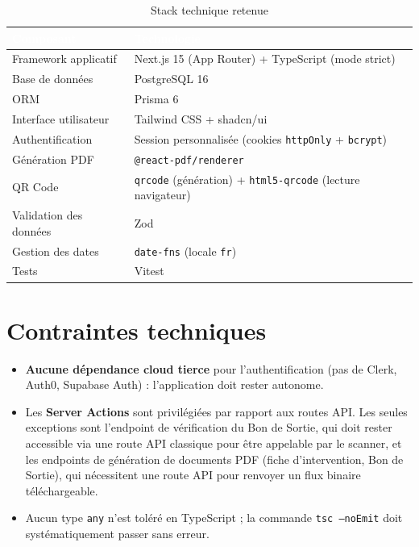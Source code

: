 \documentclass[11pt,a4paper]{report}
\begin{document}
\begin{table}[h!]
\centering
{}
\begin{tabularx}{\linewidth}{@{}l>{\raggedright\arraybackslash}X@{}}
\toprule
\rowcolor{km0blue}
\textcolor{white}{\textbf{Composant}} & \textcolor{white}{\textbf{Technologie}} \\
\midrule
Framework applicatif & Next.js 15 (App Router) + TypeScript (mode strict) \\
Base de données & PostgreSQL 16 \\
ORM & Prisma 6 \\
Interface utilisateur & Tailwind CSS + shadcn/ui \\
Authentification & Session personnalisée (cookies \texttt{httpOnly} + \texttt{bcrypt}) \\
Génération PDF & \texttt{@react-pdf/renderer} \\
QR Code & \texttt{qrcode} (génération) + \texttt{html5-qrcode} (lecture navigateur) \\
Validation des données & Zod \\
Gestion des dates & \texttt{date-fns} (locale \texttt{fr}) \\
Tests & Vitest \\
\bottomrule
\end{tabularx}
\caption{Stack technique retenue}
\end{table}

\section{Contraintes techniques}

\begin{itemize}[leftmargin=1cm]
\item \textbf{Aucune dépendance cloud tierce} pour l'authentification (pas de Clerk, Auth0,
      Supabase Auth) : l'application doit rester autonome.
\item Les \textbf{Server Actions} sont privilégiées par rapport aux routes API. Les seules
      exceptions sont l'endpoint de vérification du Bon de Sortie, qui doit rester accessible
      via une route API classique pour être appelable par le scanner, et les endpoints de
      génération de documents PDF (fiche d'intervention, Bon de Sortie), qui nécessitent une
      route API pour renvoyer un flux binaire téléchargeable.
\item Aucun type \texttt{any} n'est toléré en TypeScript ; la commande \texttt{tsc --noEmit}
      doit systématiquement passer sans erreur.
\end{itemize}
\end{document}
